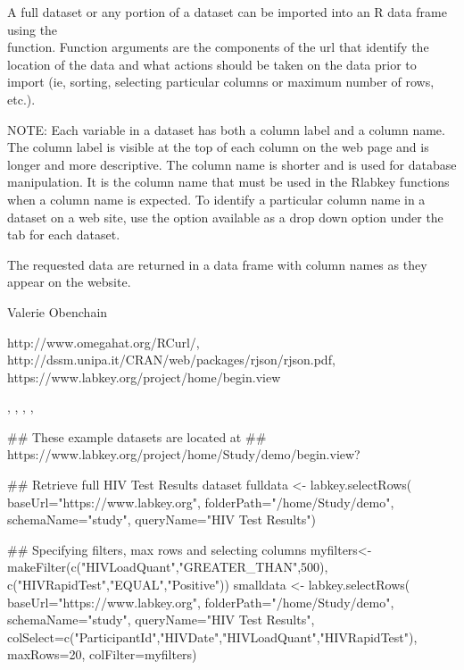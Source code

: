 \documentclass{book}
\begin{document}
\begin{Details}\relax
A full dataset or any portion of a dataset can be imported into an R data frame using the\\ 
 function. Function arguments are the components of the url that identify
the location of the data and what actions should be taken on the data prior to import
(ie, sorting, selecting particular columns or maximum number of rows, etc.).

NOTE: Each variable in a dataset has both a column label and a column name. The column label is visible at the top
of each column on the web page and is longer and more descriptive. The column name is shorter and is
used  for database manipulation. It is the column name that must be used in
the Rlabkey functions when a column name is expected. To identify a particular column name in a dataset on
a web site, use the  option available as a drop down option under the 
tab for each dataset.
\end{Details}
\begin{Value}
The requested data are returned in a data frame with column names as they appear on the website.
\end{Value}
\begin{Author}\relax
Valerie Obenchain
\end{Author}
\begin{References}\relax
http://www.omegahat.org/RCurl/,\\ 
http://dssm.unipa.it/CRAN/web/packages/rjson/rjson.pdf,\\
https://www.labkey.org/project/home/begin.view
\end{References}
\begin{SeeAlso}\relax
{}, , , 
, \\
\end{SeeAlso}
\begin{Examples}
\begin{ExampleCode}
## These example datasets are located at 
## https://www.labkey.org/project/home/Study/demo/begin.view?

## Retrieve full HIV Test Results dataset
fulldata <- labkey.selectRows(  
baseUrl="https://www.labkey.org", 
folderPath="/home/Study/demo", 
schemaName="study", 
queryName="HIV Test Results")

## Specifying filters, max rows and selecting columns
myfilters<- makeFilter(c("HIVLoadQuant","GREATER_THAN",500), 
c("HIVRapidTest","EQUAL","Positive"))
smalldata <- labkey.selectRows( 
baseUrl="https://www.labkey.org", 
folderPath="/home/Study/demo", 
schemaName="study",     
queryName="HIV Test Results", 
colSelect=c("ParticipantId","HIVDate","HIVLoadQuant","HIVRapidTest"), 
maxRows=20,
colFilter=myfilters)


\end{ExampleCode}
\end{Examples}
\end{document}
